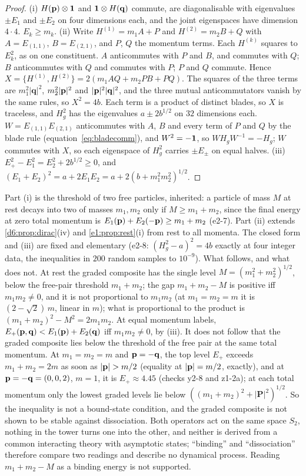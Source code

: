 \begin{proof}
(i) $H(\mathbf p)\otimes\mathbf 1$ and $\mathbf 1\otimes H(\mathbf q)$ commute, are diagonalisable with eigenvalues $\pm E_1$ and $\pm E_2$ on four dimensions each,
and the joint eigenspaces have dimension $4\cdot4$. $E_k\ge m_k$. (ii) Write $H^{(1)}=m_1A+P$ and $H^{(2)}=m_2B+Q$ with $A=E_{(1,1)}$, $B=E_{(2,1)}$,
and $P$, $Q$ the momentum terms. Each $H^{(k)}$ squares to $E_k^2$, as on one constituent. $A$ anticommutes with $P$ and $B$, and commutes with $Q$;
$B$ anticommutes with $Q$ and commutes with $P$; $P$ and $Q$ commute. Hence $X=\{H^{(1)},H^{(2)}\}=2(m_1AQ+m_2PB+PQ)$. The squares of the three
terms are $m_1^2|\mathbf q|^2$, $m_2^2|\mathbf p|^2$ and $|\mathbf p|^2|\mathbf q|^2$, and the three mutual anticommutators vanish by the same rules, so
$X^2=4b$. Each term is a product of distinct blades, so $X$ is traceless, and $H_g^2$ has the eigenvalues $a\pm2b^{1/2}$ on $32$ dimensions
each. $W=E_{(1,1)}E_{(2,1)}$ anticommutes with $A$, $B$ and every term of $P$ and $Q$ by the blade rule (equation~\cref{eq:bladecomm}), and
$W^2=-\mathbf 1$, so $WH_gW^{-1}=-H_g$; $W$ commutes with $X$, so each eigenspace of $H_g^2$ carries $\pm E_\pm$ on equal halves. (iii) $E_+^2-E_1^2=E_2^2+2b^{1/2}\ge0$, and $(E_1+E_2)^2=a+2E_1E_2=a+2(b+m_1^2m_2^2)^{1/2}$.
\end{proof}

Part (i) is the threshold of two free particles, inherited: a particle of mass $M$ at rest decays into two of masses $m_1,m_2$ only if
$M\ge m_1+m_2$, since the final energy at zero total momentum is $E_1(\mathbf p)+E_2(-\mathbf p)\ge m_1+m_2$ (e2-7). Part (ii) extends
\cref{d6:prop:dirac}(iv) and \cref{e1:prop:rest}(i) from rest to all momenta. The closed form and (iii) are fixed and
elementary (e2-8: $(H_g^2-a)^2=4b$ exactly at four integer data, the inequalities in $200$ random samples to $10^{-9}$). What follows,
and what does not. At rest the graded composite has the single level $M=(m_1^2+m_2^2)^{1/2}$, below the free-pair threshold $m_1+m_2$; the gap
$m_1+m_2-M$ is positive iff $m_1m_2\neq0$, and it is not proportional to $m_1m_2$ (at $m_1=m_2=m$ it is $(2-\sqrt2)\,m$, linear in $m$); what is
proportional to the product is $(m_1+m_2)^2-M^2=2m_1m_2$. At equal momentum labels, $E_+(\mathbf p,\mathbf q)<E_1(\mathbf p)+E_2(\mathbf q)$ iff $m_1m_2\neq0$, by (iii).
It does not follow that the graded composite lies below the threshold of the free pair at the same total momentum. At $m_1=m_2=m$ and
$\mathbf p=-\mathbf q$, the top level $E_+$ exceeds $m_1+m_2=2m$ as soon as $|\bp|>m/2$ (equality at $|\mathbf p|=m/2$, exactly), and at $\mathbf p=-\mathbf q=(0,0,2)$, $m=1$,
it is $E_+\approx4.45$ (checks y2-8 and z1-2a); at each total momentum only the lowest graded levels lie below $((m_1+m_2)^2+|\mathbf P|^2)^{1/2}$.
So the inequality is not a bound-state condition, and the graded composite is not shown to be stable against dissociation. Both operators act
on the same space $S_2$, nothing in the tower turns one into the other, and neither is derived from a common interacting theory with
asymptotic states; ``binding'' and ``dissociation'' therefore compare two readings and describe no dynamical process. Reading $m_1+m_2-M$
as a binding energy is not supported.

